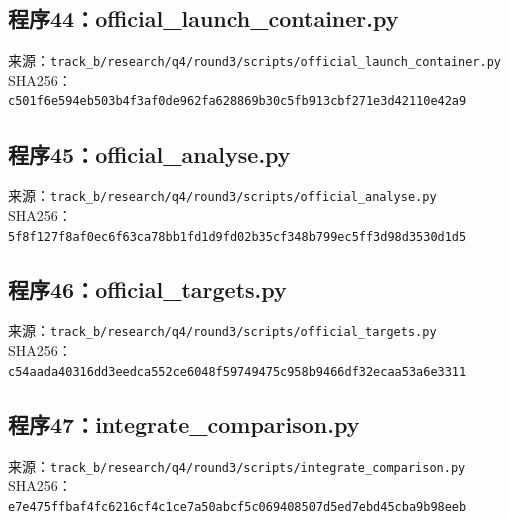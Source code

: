 \subsection*{程序44：official\_launch\_container.py}
\noindent 来源：\nolinkurl{track_b/research/q4/round3/scripts/official_launch_container.py}\\
\noindent SHA256：\texttt{c501f6e594eb503b4f3af0de962fa628}\allowbreak\texttt{869b30c5fb913cbf271e3d42110e42a9}\\
\clearpage
\subsection*{程序45：official\_analyse.py}
\noindent 来源：\nolinkurl{track_b/research/q4/round3/scripts/official_analyse.py}\\
\noindent SHA256：\texttt{5f8f127f8af0ec6f63ca78bb1fd1d9fd}\allowbreak\texttt{02b35cf348b799ec5ff3d98d3530d1d5}\\
\clearpage
\subsection*{程序46：official\_targets.py}
\noindent 来源：\nolinkurl{track_b/research/q4/round3/scripts/official_targets.py}\\
\noindent SHA256：\texttt{c54aada40316dd3eedca552ce6048f59}\allowbreak\texttt{749475c958b9466df32ecaa53a6e3311}\\
\clearpage
\subsection*{程序47：integrate\_comparison.py}
\noindent 来源：\nolinkurl{track_b/research/q4/round3/scripts/integrate_comparison.py}\\
\noindent SHA256：\texttt{e7e475ffbaf4fc6216cf4c1ce7a50abc}\allowbreak\texttt{f5c069408507d5ed7ebd45cba9b98eeb}\\
\clearpage
